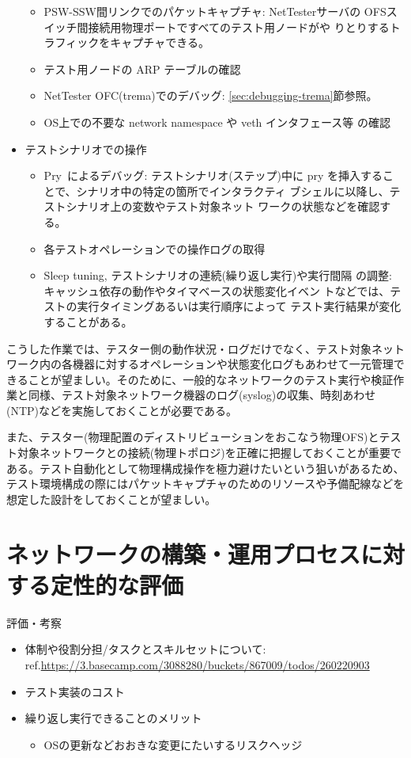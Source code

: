 \begin{itemize}
\begin{itemize}
        \item PSW-SSW間リンクでのパケットキャプチャ: NetTesterサーバの
              OFSスイッチ間接続用物理ポートですべてのテスト用ノードがや
              りとりするトラフィックをキャプチャできる。
        \item テスト用ノードの ARP テーブルの確認
        \item NetTester OFC(trema)でのデバッグ:
              \ref{sec:debugging-trema}節参照。
        \item OS上での不要な network namespace や veth インタフェース等
              の確認
       \end{itemize}
 \item テストシナリオでの操作
       \begin{itemize}
        \item Pry~\cite{pry}によるデバッグ: テストシナリオ(ステップ)中に
              pry を挿入することで、シナリオ中の特定の箇所でインタラクティ
              ブシェルに以降し、テストシナリオ上の変数やテスト対象ネット
              ワークの状態などを確認する。
        \item 各テストオペレーションでの操作ログの取得
        \item Sleep tuning, テストシナリオの連続(繰り返し実行)や実行間隔
              の調整: キャッシュ依存の動作やタイマベースの状態変化イベン
              トなどでは、テストの実行タイミングあるいは実行順序によって
              テスト実行結果が変化することがある。
       \end{itemize}
\end{itemize}

こうした作業では、テスター側の動作状況・ログだけでなく、テスト対象ネット
ワーク内の各機器に対するオペレーションや状態変化ログもあわせて一元管理で
きることが望ましい。そのために、一般的なネットワークのテスト実行や検証作
業と同様、テスト対象ネットワーク機器のログ(syslog)の収集、時刻あわせ
(NTP)などを実施しておくことが必要である。

また、テスター(物理配置のディストリビューションをおこなう物理OFS)とテス
ト対象ネットワークとの接続(物理トポロジ)を正確に把握しておくことが重要で
ある。テスト自動化として物理構成操作を極力避けたいという狙いがあるため、
テスト環境構成の際にはパケットキャプチャのためのリソースや予備配線などを
想定した設計をしておくことが望ましい。

\section{ネットワークの構築・運用プロセスに対する定性的な評価}
評価・考察
\begin{itemize}
 \item 体制や役割分担/タスクとスキルセットについて: ref.\url{https://3.basecamp.com/3088280/buckets/867009/todos/260220903}
 \item テスト実装のコスト
 \item 繰り返し実行できることのメリット
       \begin{itemize}
        \item OSの更新などおおきな変更にたいするリスクヘッジ
       \end{itemize}
\end{itemize}


